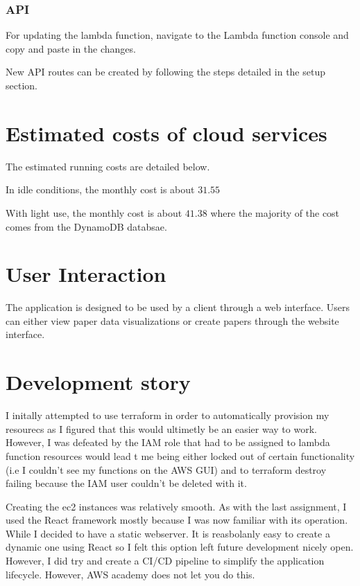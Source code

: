 \documentclass[12pt]{article}
\begin{document}
\subsubsection{API}

For updating the lambda function, navigate to the Lambda function console and copy and paste in the changes.

New API routes can be created by following the steps detailed in the setup section.

\section{Estimated costs of cloud services}
The estimated running costs are detailed below.

In idle conditions, the monthly cost is about $31.55$

With light use, the monthly cost is about $41.38$ where the majority of the cost comes from the DynamoDB databsae.

\section{User Interaction}

The application is designed to be used by a client through a web interface. Users can either view paper data visualizations or create papers through the website interface. 


\section{Development story}

I initally attempted to use terraform in order to automatically provision my resourecs as I figured that this would ultimetly be an easier way to work.
However, I was defeated by the IAM role that had to be assigned to lambda function resources would lead t me being either locked out of certain functionality (i.e I couldn't see my functions on the AWS GUI) and to terraform destroy failing because the IAM user couldn't be deleted with it.

Creating the ec2 instances was relatively smooth. As with the last assignment, I used the React framework mostly because I was now familiar with its operation. While I decided to have a static webserver. It is reasbolanly easy to create a dynamic one using React so I felt this option left future development nicely open.
However, I did try and create a CI/CD pipeline to simplify the application lifecycle. However, AWS academy does not let you do this.
\end{document}
